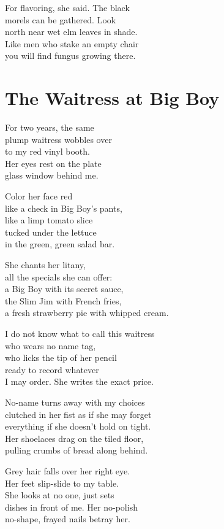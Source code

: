 \documentclass[twoside,10pt]{book}
\begin{document}
For flavoring, she said. The black\\
morels can be gathered. Look\\
north near wet elm leaves in shade.\\
Like men who stake an empty chair\\
you will find fungus growing there.


\clearpage
\section{The Waitress at Big Boy}

For two years, the same\\
plump waitress wobbles over\\
to my red vinyl booth.\\
Her eyes rest on the plate\\
glass window behind me.

Color her face red\\
like a check in Big Boy's pants,\\
like a limp tomato slice\\
tucked under the lettuce\\
in the green, green salad bar.

She chants her litany,\\
all the specials she can offer:\\
a Big Boy with its secret sauce,\\
the Slim Jim with French fries,\\
a fresh strawberry pie with whipped cream.

I do not know what to call this waitress\\
who wears no name tag,\\
who licks the tip of her pencil\\
ready to record whatever\\
I may order. She writes the exact price.

No-name turns away with my choices\\
clutched in her fist as if she may forget\\
everything if she doesn't hold on tight.\\
Her shoelaces drag on the tiled floor,\\
pulling crumbs of bread along behind.

Grey hair falls over her right eye.\\
Her feet slip-slide to my table.\\
She looks at no one, just sets\\
dishes in front of me. Her no-polish\\
no-shape, frayed nails betray her.
\end{document}
